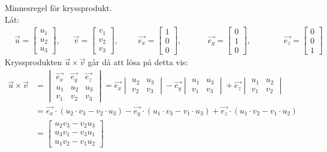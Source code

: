 \begin{Ex}
    Minnesregel för kryssprodukt.\\
    Låt:
    \begin{align*}
    &\vec{u} = \begin{bmatrix} u_1\\u_2\\u_3 \end{bmatrix}, 
    &&\vec{v} = \begin{bmatrix} v_1\\v_2\\v_3 \end{bmatrix}, 
    &&&\vec{e_x} = \begin{bmatrix} 1\\0\\0 \end{bmatrix}, 
    &&&&\vec{e_y} = \begin{bmatrix} 0\\1\\0 \end{bmatrix}, 
    &&&&&\vec{e_z} = \begin{bmatrix} 0\\0\\1 \end{bmatrix}
    \end{align*}
    Kryssprodukten $\vec{u} \times \vec{v}$ går då att lösa på detta vis:
    \begin{align*}
    \vec{u} \times \vec{v} &= \begin{vmatrix} \vec{e_x}&\vec{e_y}&\vec{e_z}\\u_1&u_2&u_3\\v_1&v_2&v_3 \end{vmatrix} = \vec{e_x} \begin{vmatrix} u_2&u_3\\v_2&v_3 \end{vmatrix} - \vec{e_y} \begin{vmatrix} u_1&u_3\\v_1&v_3 \end{vmatrix} + \vec{e_z} \begin{vmatrix} u_1&u_2\\v_1&v_2 \end{vmatrix}\\
    &= \vec{e_x} \cdot (u_2 \cdot v_3 - v_2 \cdot u_3) - \vec{e_y} \cdot (u_1 \cdot v_3 - v_1 \cdot u_3) + \vec{e_z} \cdot (u_1 \cdot v_2 - v_1 \cdot u_2)\\
    &= \begin{bmatrix} u_2v_3 - v_2u_3\\u_3v_1 - v_3u_1\\u_1v_2 - v_1u_2 \end{bmatrix}
    \end{align*}
\end{Ex}

